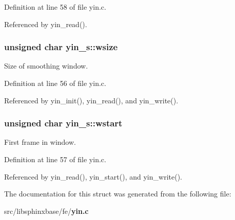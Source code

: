 Definition at line 58 of file yin.\-c.



Referenced by yin\-\_\-read().

\subsubsection[{wsize}]{\setlength{\rightskip}{0pt plus 5cm}unsigned char yin\-\_\-s\-::wsize}\label{structyin__s_a024d8e9d70f94a7f62457154fb5a4b03}


Size of smoothing window. 



Definition at line 56 of file yin.\-c.



Referenced by yin\-\_\-init(), yin\-\_\-read(), and yin\-\_\-write().

\subsubsection[{wstart}]{\setlength{\rightskip}{0pt plus 5cm}unsigned char yin\-\_\-s\-::wstart}\label{structyin__s_a18481851da6db4df2a469b80c2c5704e}


First frame in window. 



Definition at line 57 of file yin.\-c.



Referenced by yin\-\_\-read(), yin\-\_\-start(), and yin\-\_\-write().



The documentation for this struct was generated from the following file\-:\begin{DoxyCompactItemize}
\item 
src/libsphinxbase/fe/{\bf yin.\-c}\end{DoxyCompactItemize}

